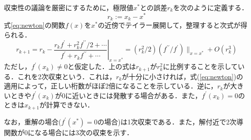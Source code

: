 \documentclass[a4j,11pt]{jarticle}
\begin{document}
収束性の議論を厳密にするために，極限値$x^*$との誤差$r_k$を次のように定義する．
\begin{equation}
r_k:=x_k-x^*
\label{eq:syuusoku}
\end{equation}
式\ref{eq:newton}の関数$f(x)$を$x^*$の近傍でテイラー展開して，整理すると次式が得られる\cite{author1}．
\begin{equation}
r_{k+1}=r_k-\left. \frac{r_kf^\prime+r^2_kf^{\prime\prime}/2+\cdots}{f^\prime+r_kf^{\prime\prime}+\cdots} \right|_{x=x^*}
=(r^2_k/2)(f^{\prime\prime}/f^\prime)\|_{x=x^*}+O(r^3_k)
\label{eq:taylor}
\end{equation}
ただし，$f^\prime(x_k)\neq 0$と仮定した．上の式は$r_{k+1}$が$r^2_k$に比例することを示している．これを2次収束という．これは，$r_k$が十分に小さければ，式(\ref{eq:newton})の適用によって，正しい桁数がほぼ2倍になることを示している．逆に，$r_k$が大きいときや$f^\prime(x_k)$が$0$に近いときには発散する場合がある．また，$f^\prime(x_k)=0$のときは$x_{k+1}$が計算できない．

なお，重解の場合($f^\prime(x^*)=0$の場合)は1次収束である．また，解付近で2次導関数が$0$になる場合には3次の収束を示す．
\end{document}
